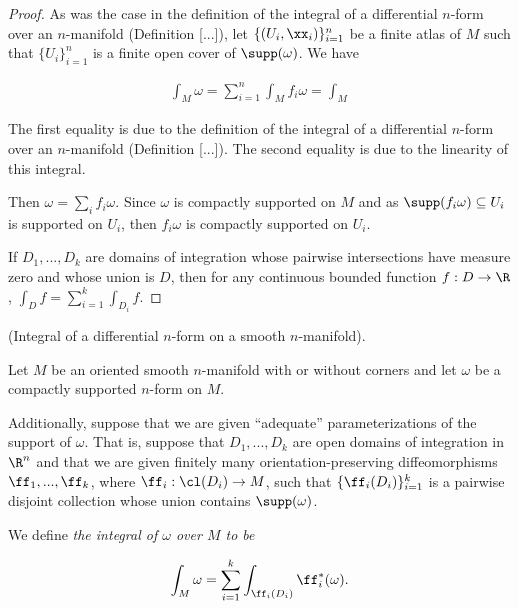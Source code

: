 \begin{proof}
   
    As was the case in the definition of the integral of a differential $n$-form over an $n$-manifold (Definition [...]), let $\{(U_i, \xx_i)\}_{i = 1}^n$ be a finite atlas of $M$ such that $\{U_i\}_{i = 1}^n$ is a finite open cover of $\supp(\omega)$. We have
   
   \begin{align*}
       \int_M \omega = \sum_{i = 1}^n \int_M f_i \omega = \int_M 
   \end{align*}
   
   The first equality is due to the definition of the integral of a differential $n$-form over an $n$-manifold (Definition [...]). The second equality is due to the linearity of this integral.
   
   Then $\omega = \sum_i f_i \omega$. Since $\omega$ is compactly supported on $M$ and as $\supp(f_i \omega) \subseteq U_i$ is supported on $U_i$, then $f_i \omega$ is compactly supported on $U_i$. 
   

     If $D_1, ..., D_k$ are domains of integration whose pairwise intersections have measure zero and whose union is $D$, then for any continuous bounded function $f:D \rightarrow \R$, $\int_D f = \sum_{i = 1}^k \int_{D_i} f$.
    
\end{proof}


\begin{defn}
     (Integral of a differential $n$-form on a smooth $n$-manifold).
    
    Let $M$ be an oriented smooth $n$-manifold with or without corners and let $\omega$ be a compactly supported $n$-form on $M$. 
    
    Additionally, suppose that we are given ``adequate'' parameterizations of the support of $\omega$. That is, suppose that  $D_1, ..., D_k$ are open domains of integration in $\R^n$ and that we are given finitely many orientation-preserving diffeomorphisms $\ff_1, ..., \ff_k$, where $\ff_i:\cl(D_i) \rightarrow M$, such that $\{\ff_i(D_i)\}_{i = 1}^k$ is a pairwise disjoint collection whose union contains $\supp(\omega)$. 
    
    We define \textit{the integral of $\omega$ over $M$ to be}
    
    \begin{align*}
        \int_M \omega = \sum_{i = 1}^k \int_{\ff_i(D_i)} \ff_i^*(\omega).
    \end{align*}
\end{defn}

